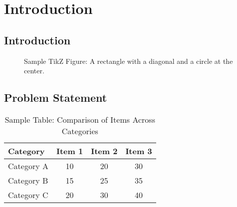 \chapter{Introduction}

\section{Introduction}

    \lipsum[1]

    \begin{figure}[ht]
        \centering
        \caption{Sample TikZ Figure: A rectangle with a diagonal and a circle at the center.}
        \label{fig:sample}
    \end{figure}
    
    \lipsum[2]
    
    \lipsum[3]

\section{Problem Statement} 

    \lipsum[1]
    
    \begin{table}[ht]
        \centering
        \caption{Sample Table: Comparison of Items Across Categories}
        \begin{tabular}{lccc}
            \toprule
            \textbf{Category} & \textbf{Item 1} & \textbf{Item 2} & \textbf{Item 3} \\
            \midrule
            Category A & 10 & 20 & 30 \\
            Category B & 15 & 25 & 35 \\
            Category C & 20 & 30 & 40 \\
            \bottomrule
        \end{tabular}
        \label{tab:sample}
    \end{table}

